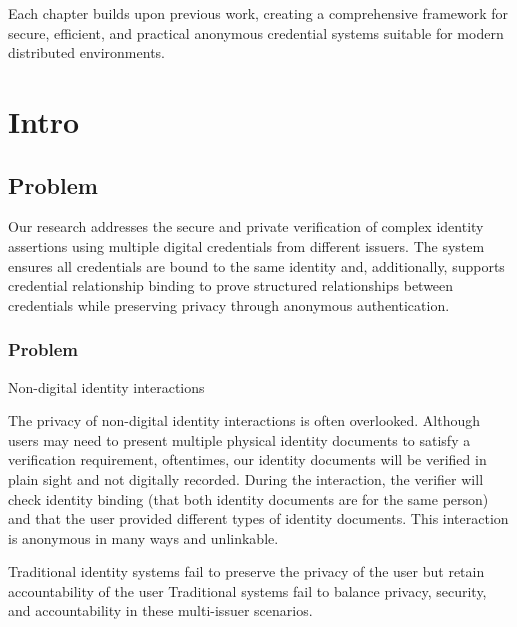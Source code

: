 Each chapter builds upon previous work, creating a comprehensive framework for secure, efficient, and practical anonymous credential systems suitable for modern distributed environments.

\section{Intro}
\subsection{Problem}
Our research addresses the secure and private verification of complex identity assertions using multiple digital credentials from different issuers. The system ensures all credentials are bound to the same identity and, additionally, supports credential relationship binding to prove structured relationships between credentials while preserving privacy through anonymous authentication.


\subsubsection{Problem}

Non-digital identity interactions 

The privacy of non-digital identity interactions is often overlooked. Although users may need to present multiple physical identity documents to satisfy a verification requirement, oftentimes, our identity documents will be verified in plain sight and not digitally recorded. During the interaction, the verifier will check identity binding (that both identity documents are for the same person) and that the user provided different types of identity documents. This interaction is anonymous in many ways and unlinkable. 

Traditional identity systems fail to preserve the privacy of the user but retain accountability of the user 
Traditional systems fail to balance privacy, security, and accountability in these multi-issuer scenarios.

